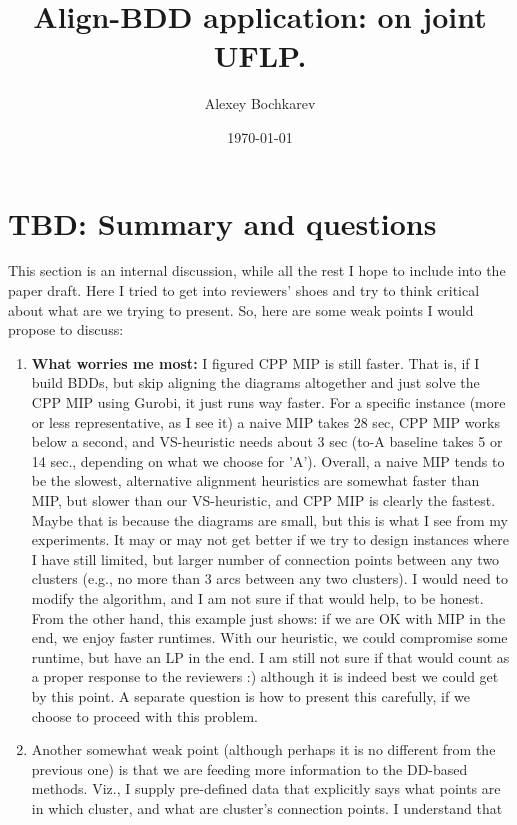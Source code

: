 \documentclass[11pt]{article}
\author{Alexey Bochkarev}
\date{\today}
\title{Align-BDD application: on joint UFLP.}
\begin{document}
\maketitle

\section{TBD: Summary and questions}
\label{sec:orgef0e50f}
This section is an internal discussion, while all the rest I hope to include
into the paper draft. Here I tried to get into reviewers'
shoes and try to think critical about what are we trying to present. So, here
are some weak points I would propose to discuss:

\begin{enumerate}
\item \textbf{What worries me most:} I figured CPP MIP is still faster. That is, if I
build BDDs, but skip aligning the diagrams altogether and just solve the CPP
MIP using Gurobi, it just runs way faster. For a specific instance (more or
less representative, as I see it) a naive MIP takes 28 sec, CPP MIP works
below a second, and VS-heuristic needs about 3 sec (to-A baseline takes 5 or
14 sec., depending on what we choose for 'A'). Overall, a naive MIP tends to
be the slowest, alternative alignment heuristics are somewhat faster than
MIP, but slower than our VS-heuristic, and CPP MIP is clearly the fastest.
Maybe that is because the diagrams are small, but this is what I see from my
experiments. It may or may not get better if we try to design instances where
I have still limited, but larger number of connection points between any two
clusters (e.g., no more than 3 arcs between any two clusters). I would need
to modify the algorithm, and I am not sure if that would help, to be honest.
From the other hand, this example just shows: if we are OK with MIP in the
end, we enjoy faster runtimes. With our heuristic, we could compromise some
runtime, but have an LP in the end. I am still not sure if that would count
as a proper response to the reviewers :) although it is indeed best we could
get by this point. A separate question is how to present this carefully, if
we choose to proceed with this problem.
\item Another somewhat weak point (although perhaps it is no different from the
previous one) is that we are feeding more information to the DD-based
methods. Viz., I supply pre-defined data that explicitly says what points are
in which cluster, and what are cluster's connection points. I understand that

\end{enumerate}
\end{document}
